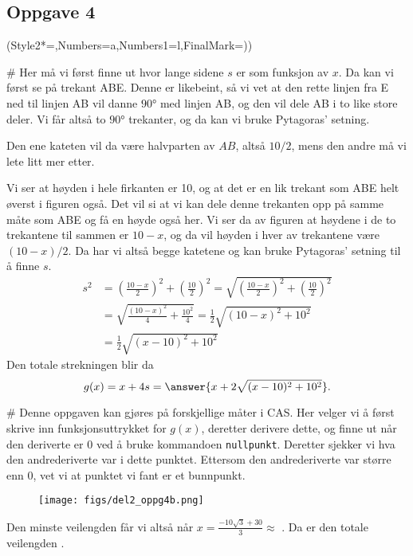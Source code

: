 \subsection*{Oppgave 4}

\begin{easylist}[enumerate]
	\ListProperties(Style2*=,Numbers=a,Numbers1=l,FinalMark={)})
	
	# Her må vi først finne ut hvor lange sidene $s$ er som funksjon av $x$. 
	Da kan vi først se på trekant ABE. 
	Denne er likebeint, så vi vet at den rette linjen fra E ned til linjen AB vil danne $\ang{90}$ med linjen AB, og den vil dele AB i to like store deler. 
	Vi får altså to $\ang{90}$ trekanter, og da kan vi bruke Pytagoras' setning. 
	
	Den ene kateten vil da være halvparten av $AB$, altså $10/2$, mens den andre må vi lete litt mer etter.
	
	Vi ser at høyden i hele firkanten er 10, og at det er en lik trekant som ABE helt øverst i figuren også. 
	Det vil si at vi kan dele denne trekanten opp på samme måte som ABE og få en høyde også her. 
	Vi ser da av figuren at høydene i de to trekantene til sammen er $10-x$, og da vil høyden i hver av trekantene være $(10 - x)/ 2$. 
	Da har vi altså begge katetene og kan bruke Pytagoras' setning til å finne $s$.
	\begin{align*}
		s^2 &= \left (\frac{10-x}{2} \right)^2	+ \left(\frac{10}{2} \right)^2  
		= \sqrt{\left (\frac{10-x}{2} \right)^2 + \left(\frac{10}{2} \right)^2} \\
		 & = \sqrt{\frac{(10-x)^2}{4} + \frac{10^2}{4}}  
		 = \frac{1}{2} \sqrt{(10-x)^2 + 10^2} \\
		 & = \frac{1}{2} \sqrt{(x-10)^2 + 10^2} 		
	\end{align*}
	Den totale strekningen blir da
	\begin{equation*}
			g(x) = x + 4s = \answer{x + 2\sqrt{(x-10)^2 + 10^2}}.	
	\end{equation*}
	
	
	# Denne oppgaven kan gjøres på forskjellige måter i CAS. 
	Her velger vi å først skrive inn funksjonsuttrykket for $g(x)$, deretter derivere dette, og finne ut når den deriverte er $0$ ved å bruke kommandoen \verb|nullpunkt|. 
	Deretter sjekker vi hva den andrederiverte var i dette punktet. 
	Ettersom den andrederiverte var større enn $0$, vet vi at punktet vi fant er et bunnpunkt.
	
	
	\begin{figure}[ht!]
		\centering
		\texttt{[image: figs/del2\_oppg4b.png]}
	\end{figure}
	
	Den minste veilengden får vi altså når $x = \frac{-10 \sqrt{3} + 30}{3} \approx$ . Da er den totale veilengden .
\end{easylist}



